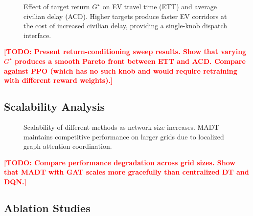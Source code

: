 \documentclass[journal]{IEEEtran}
\newcommand{\todo}[1]{\textcolor{red}{\textbf{[TODO: #1]}}}
\begin{document}
\begin{figure}[t]
  \centering
  \caption{Effect of target return $G^\star$ on EV travel time (ETT)
    and average civilian delay (ACD).  Higher targets produce faster
    EV corridors at the cost of increased civilian delay, providing a
    single-knob dispatch interface.}
  \label{fig:return_sweep}
\end{figure}

\todo{Present return-conditioning sweep results.  Show that varying
$G^\star$ produces a smooth Pareto front between ETT and ACD.  Compare
against PPO (which has no such knob and would require retraining with
different reward weights).}

\subsection{Scalability Analysis}
\label{sec:results:scale}

\begin{figure}[t]
  \centering
  \caption{Scalability of different methods as network size increases.
    MADT maintains competitive performance on larger grids due to
    localized graph-attention coordination.}
  \label{fig:scalability}
\end{figure}

\todo{Compare performance degradation across grid sizes.  Show that
MADT with GAT scales more gracefully than centralized DT and DQN.}

\subsection{Ablation Studies}
\label{sec:results:ablation}
\end{document}
